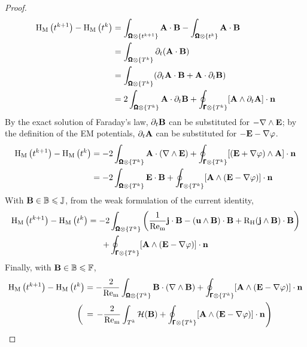         \begin{proof}
            \begin{align}
                \mathrm{H}_{\mathrm{M}}\left(t^{k + 1}\right) - \mathrm{H}_{\mathrm{M}}\left(t^{k}\right)  &=  \int_{\pmb{\mathsf{\Omega}}\otimes\left\{t^{k + 1}\right\}}\mathbf{A}\cdot\mathbf{B} - \int_{\pmb{\mathsf{\Omega}}\otimes\left\{t^{k}\right\}}\mathbf{A}\cdot\mathbf{B}  \\
                &=  \int_{\pmb{\mathsf{\Omega}}\otimes\left\{T^{k}\right\}}\partial_{t}(\mathbf{A}\cdot\mathbf{B})  \\
                &=  \int_{\pmb{\mathsf{\Omega}}\otimes\left\{T^{k}\right\}}(\partial_{t}\mathbf{A}\cdot\mathbf{B} + \mathbf{A}\cdot\partial_{t}\mathbf{B})  \\
                &=  2\int_{\pmb{\mathsf{\Omega}}\otimes\left\{T^{k}\right\}}\mathbf{A}\cdot\partial_{t}\mathbf{B} + \oint_{\pmb{\mathsf{\Gamma}}\otimes\left\{T^{k}\right\}}[\mathbf{A}\wedge\partial_{t}\mathbf{A}]\cdot\mathbf{n}
            \end{align}
            By the exact solution of Faraday's law, $\partial_{t}\mathbf{B}$ can be substituted for $- \nabla\wedge\mathbf{E}$; by the definition of the EM potentials, $\partial_{t}\mathbf{A}$ can be substituted for $- \mathbf{E} - \nabla\varphi$.
            \begin{align}
                \mathrm{H}_{\mathrm{M}}\left(t^{k + 1}\right) - \mathrm{H}_{\mathrm{M}}\left(t^{k}\right)  &=  - 2\int_{\pmb{\mathsf{\Omega}}\otimes\left\{T^{k}\right\}}\mathbf{A}\cdot(\nabla\wedge\mathbf{E}) + \oint_{\pmb{\mathsf{\Gamma}}\otimes\left\{T^{k}\right\}}[(\mathbf{E} + \nabla\varphi)\wedge\mathbf{A}]\cdot\mathbf{n}  \\
                &=  - 2\int_{\pmb{\mathsf{\Omega}}\otimes\left\{T^{k}\right\}}\mathbf{E}\cdot\mathbf{B} + \oint_{\pmb{\mathsf{\Gamma}}\otimes\left\{T^{k}\right\}}[\mathbf{A}\wedge(\mathbf{E} - \nabla\varphi)]\cdot\mathbf{n}
            \end{align}
            With $\mathbf{B}  \in  \mathbb{B}  \leqslant  \mathbb{J}$, from the weak formulation of the current identity,
            \begin{multline}
                \mathrm{H}_{\mathrm{M}}\left(t^{k + 1}\right) - \mathrm{H}_{\mathrm{M}}\left(t^{k}\right)  =  - 2\int_{\pmb{\mathsf{\Omega}}\otimes\left\{T^{k}\right\}}\left(\frac{1}{\mathrm{Re}_{\mathrm{m}}}\mathbf{j}\cdot\mathbf{B} - (\mathbf{u}\wedge\mathbf{B})\cdot\mathbf{B} + \mathrm{R}_{\mathrm{H}}(\mathbf{j}\wedge\mathbf{B})\cdot\mathbf{B}\right)  \\
                + \oint_{\pmb{\mathsf{\Gamma}}\otimes\left\{T^{k}\right\}}[\mathbf{A}\wedge(\mathbf{E} - \nabla\varphi)]\cdot\mathbf{n}
            \end{multline}
            Finally, with $\mathbf{B}  \in  \mathbb{B}  \leqslant  \mathbb{F}$,
            \begin{align}
                \rmH_{\rmM}\left(t^{k + 1}\right) - \rmH_{\rmM}\left(t^{k}\right)  &=  - \frac{2}{\rmRem}\int_{\bfOmega\otimes\left\{T^{k}\right\}}\bfB\cdot(\nabla\wedge\bfB) + \oint_{\bfGamma\otimes\left\{T^{k}\right\}}[\bfA\wedge(\bfE - \nabla\varphi)]\cdot\bfn  \\
                \left(\tall\right.&=  \left.- \frac{2}{\rmRem}\int_{T^{k}}\calH(\bfB) + \oint_{\bfGamma\otimes\left\{T^{k}\right\}}[\bfA\wedge(\bfE - \nabla\varphi)]\cdot\bfn\tall\right)
            \end{align}
        \end{proof}